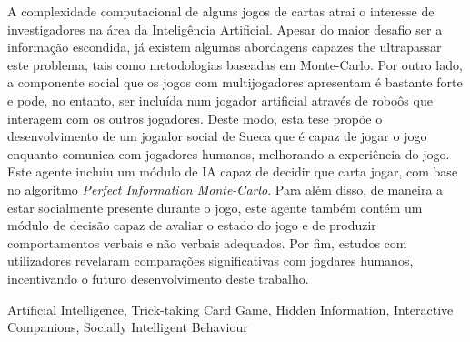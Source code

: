 \begin{resumo}

A complexidade computacional de alguns jogos de cartas atrai o interesse de investigadores na área da Inteligência Artificial.
Apesar do maior desafio ser a informação escondida, já existem algumas abordagens capazes the ultrapassar este problema, tais como metodologias baseadas em Monte-Carlo.
Por outro lado, a componente social que os jogos com multijogadores apresentam é bastante forte e pode, no entanto, ser incluída num jogador artificial através de roboôs que interagem com os outros jogadores.
Deste modo, esta tese propõe o desenvolvimento de um jogador social de Sueca que é capaz de jogar o jogo enquanto comunica com jogadores humanos, melhorando a experiência do jogo.
Este agente incluiu um módulo de IA capaz de decidir que carta jogar, com base no algoritmo \emph{Perfect Information Monte-Carlo}.
Para além disso, de maneira a estar socialmente presente durante o jogo, este agente também contém um módulo de decisão capaz de avaliar o estado do jogo e de produzir comportamentos verbais e não verbais adequados.
Por fim, estudos com utilizadores revelaram comparações significativas com jogdares humanos, incentivando o futuro desenvolvimento deste trabalho.
\end{resumo}

\begin{palavraschave}
Artificial Intelligence, Trick-taking Card Game, Hidden Information, Interactive Companions, Socially Intelligent Behaviour
\end{palavraschave}

\clearpage
\thispagestyle{empty}
\cleardoublepage